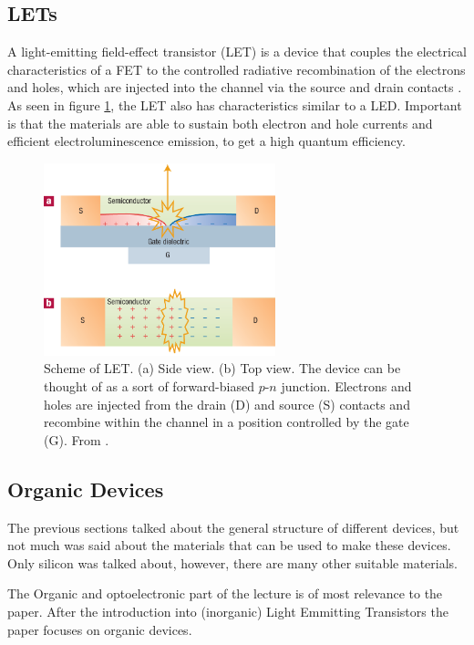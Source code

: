 \subsection{LETs}

A light-emitting field-effect transistor (LET) is a device that couples the electrical characteristics of a FET to the controlled radiative recombination of the electrons and holes, which are injected into the channel via the source and drain contacts \citep{Muccini}. As seen in figure \ref{fig:LET}, the LET also has characteristics similar to a LED. Important is that the materials are able to sustain both electron and hole currents and efficient electroluminescence emission, to get a high quantum efficiency.

\begin{figure}[!ht]
 \begin{center}
  \includegraphics[width=0.6\textwidth]{fig_B1}
  \caption{Scheme of LET. (a) Side view. (b) Top view. The device can be thought of as a sort of forward-biased $p$-$n$ junction. Electrons and holes are injected from the drain (D) and source (S) contacts and recombine within the channel in a position controlled by the gate (G). From \citet{Muccini}.}
  \label{fig:LET}
 \end{center}
\end{figure}


\subsection{Organic Devices}
The previous sections talked about the general structure of different devices, but not much was said about the materials that can be used to make these devices. Only silicon was talked about, however, there are many other suitable materials.


The Organic and optoelectronic part of the lecture is of most relevance to the paper. After the introduction into (inorganic) Light Emmitting Transistors the paper focuses on organic devices.  \citep{loinotes}

